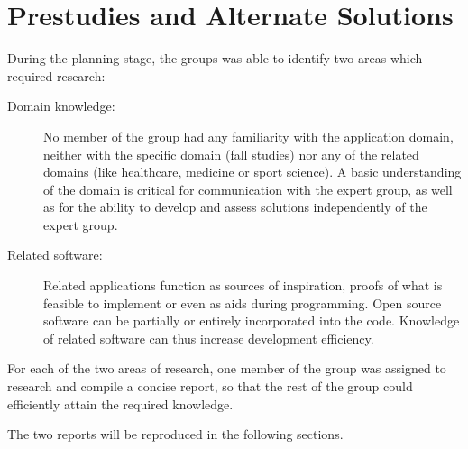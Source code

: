 \chapter{Prestudies and Alternate Solutions}
During the planning stage, the groups was able to identify two areas which required research:
\begin{description}
\item[Domain knowledge:] No member of the group had any familiarity with the application domain, neither with the specific domain (fall studies) nor any of the related domains (like healthcare, medicine or sport science). A basic understanding of the domain is critical for communication with the expert group, as well as for the ability to develop and assess solutions independently of the expert group.
\item[Related software:] Related applications function as sources of inspiration, proofs of what is feasible to implement or even as aids during programming. Open source software can be partially or entirely incorporated into the code. Knowledge of related software can thus increase development efficiency.  
\end{description}
For each of the two areas of research, one member of the group was assigned to research and compile a concise report, so that the rest of the group could efficiently attain the required knowledge.   

The two reports will be reproduced in the following sections.









